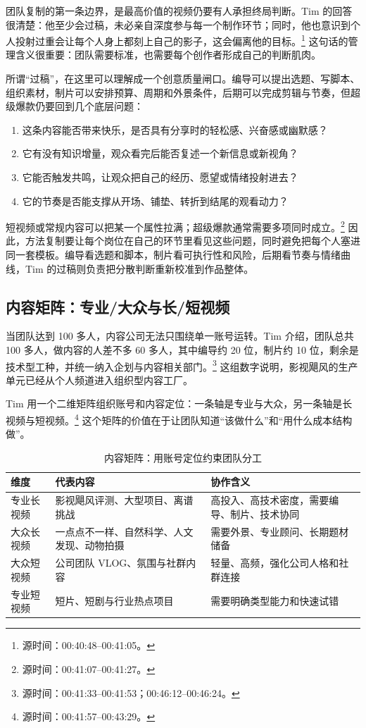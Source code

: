 \documentclass[a4paper]{article}
\begin{document}
团队复制的第一条边界，是最高价值的视频仍要有人承担终局判断。Tim 的回答很清楚：他至少会过稿，未必亲自深度参与每一个制作环节；同时，他也意识到个人投射过重会让每个人身上都刻上自己的影子，这会偏离他的目标。\footnote{源时间：00:40:48--00:41:05。} 这句话的管理含义很重要：团队需要标准，也需要每个创作者形成自己的判断肌肉。

所谓“过稿”，在这里可以理解成一个创意质量闸口。编导可以提出选题、写脚本、组织素材，制片可以安排预算、周期和外景条件，后期可以完成剪辑与节奏，但超级爆款仍要回到几个底层问题：

\begin{enumerate}
  \item 这条内容能否带来快乐，是否具有分享时的轻松感、兴奋感或幽默感？
  \item 它有没有知识增量，观众看完后能否复述一个新信息或新视角？
  \item 它能否触发共鸣，让观众把自己的经历、愿望或情绪投射进去？
  \item 它的节奏是否能支撑从开场、铺垫、转折到结尾的观看动力？
\end{enumerate}

短视频或常规内容可以把某一个属性拉满；超级爆款通常需要多项同时成立。\footnote{源时间：00:41:07--00:41:27。} 因此，方法复制要让每个岗位在自己的环节里看见这些问题，同时避免把每个人塞进同一套模板。编导看选题和脚本，制片看可执行性和风险，后期看节奏与情绪曲线，Tim 的过稿则负责把分散判断重新校准到作品整体。

\subsection{内容矩阵：专业/大众与长/短视频}

当团队达到 100 多人，内容公司无法只围绕单一账号运转。Tim 介绍，团队总共 100 多人，做内容的人差不多 60 多人，其中编导约 20 位，制片约 10 位，剩余是技术型工种，并统一纳入企划与内容相关部门。\footnote{源时间：00:41:33--00:41:53；00:46:12--00:46:24。} 这组数字说明，影视飓风的生产单元已经从个人频道进入组织型内容工厂。

Tim 用一个二维矩阵组织账号和内容定位：一条轴是专业与大众，另一条轴是长视频与短视频。\footnote{源时间：00:41:57--00:43:29。} 这个矩阵的价值在于让团队知道“该做什么”和“用什么成本结构做”。

\begin{table}[htbp]
  \centering
  \caption{内容矩阵：用账号定位约束团队分工}
  \label{tab:content-matrix}
  \begin{tabular}{lll}
    \toprule
    维度 & 代表内容 & 协作含义 \\
    \midrule
    专业长视频 & 影视飓风评测、大型项目、离谱挑战 & 高投入、高技术密度，需要编导、制片、技术协同 \\
    大众长视频 & 一点点不一样、自然科学、人文发现、动物拍摄 & 需要外景、专业顾问、长期题材储备 \\
    大众短视频 & 公司团队 VLOG、氛围与社群内容 & 轻量、高频，强化公司人格和社群连接 \\
    专业短视频 & 短片、短剧与行业热点项目 & 需要明确类型能力和快速试错 \\
    \bottomrule
  \end{tabular}
\end{table}
\end{document}
